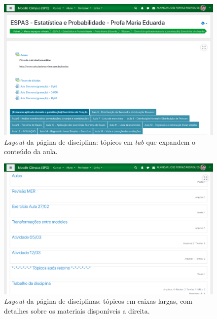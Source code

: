 \documentclass[11pt]{article}
\begin{document}
\begin{figure}[htbp]
\centering
\includegraphics[width=.9\linewidth]{./media/disc_2.png}
\caption[\emph{tab}]{\label{fig:org12b39f8}\emph{Layout} da página de disciplina: tópicos em \emph{tab} que expandem o conteúdo da aula.}
\end{figure}
\begin{figure}[htbp]
\centering
\includegraphics[width=.9\linewidth]{./media/disc_3.png}
\caption[\emph{Layout}]{\label{fig:org86fdd05}\emph{Layout} da página de disciplinas: tópicos em caixas largas, com detalhes sobre os materiais disponíveis a direita.}
\end{figure}
\end{document}
